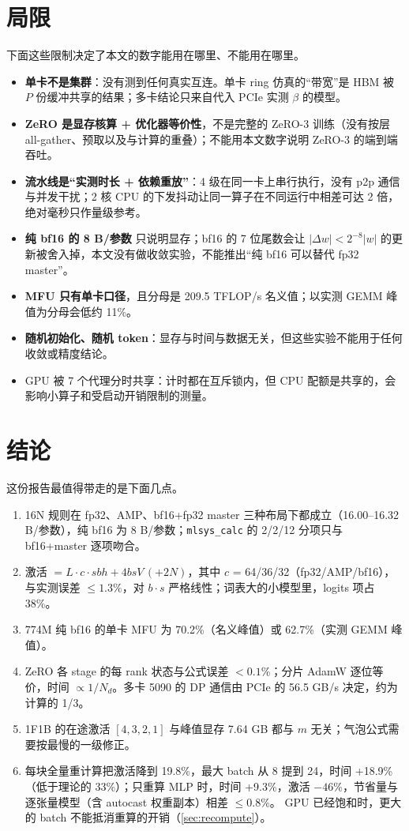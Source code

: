 \documentclass[11pt,a4paper]{ctexart}
\begin{document}
\section{局限}\label{sec:caveat}
下面这些限制决定了本文的数字能用在哪里、不能用在哪里。
\begin{caveatbox}
\begin{itemize}
\item \textbf{单卡不是集群}：没有测到任何真实互连。单卡 ring 仿真的“带宽”是 HBM 被 $P$ 份缓冲共享的结果；多卡结论只来自代入 PCIe 实测 $\beta$ 的模型。
\item \textbf{ZeRO 是显存核算 + 优化器等价性}，不是完整的 ZeRO-3 训练（没有按层 all-gather、预取以及与计算的重叠）；不能用本文数字说明 ZeRO-3 的端到端吞吐。
\item \textbf{流水线是“实测时长 + 依赖重放”}：4 级在同一卡上串行执行，没有 p2p 通信与并发干扰；2 核 CPU 的下发抖动让同一算子在不同运行中相差可达 2 倍，绝对毫秒只作量级参考。
\item \textbf{纯 bf16 的 8 B/参数} 只说明显存；bf16 的 7 位尾数会让 $|\Delta w| < 2^{-8}|w|$ 的更新被舍入掉，本文没有做收敛实验，不能推出“纯 bf16 可以替代 fp32 master”。
\item \textbf{MFU 只有单卡口径}，且分母是 209.5 TFLOP/s 名义值；以实测 GEMM 峰值为分母会低约 11\%。
\item \textbf{随机初始化、随机 token}：显存与时间与数据无关，但这些实验不能用于任何收敛或精度结论。
\item GPU 被 7 个代理分时共享：计时都在互斥锁内，但 CPU 配额是共享的，会影响小算子和受启动开销限制的测量。
\end{itemize}
\end{caveatbox}

\section{结论}
这份报告最值得带走的是下面几点。
\begin{enumerate}
\item 16N 规则在 fp32、AMP、bf16+fp32 master 三种布局下都成立（16.00--16.32 B/参数），纯 bf16 为 8 B/参数；\texttt{mlsys\_calc} 的 2/2/12 分项只与 bf16+master 逐项吻合。
\item 激活 $=L\cdot c\cdot sbh + 4bsV\,(+2N)$，其中 $c$ = 64/36/32（fp32/AMP/bf16），与实测误差 $\le1.3\%$，对 $b\cdot s$ 严格线性；词表大的小模型里，logits 项占 38\%。
\item 774M 纯 bf16 的单卡 MFU 为 70.2\%（名义峰值）或 62.7\%（实测 GEMM 峰值）。
\item ZeRO 各 stage 的每 rank 状态与公式误差 $<0.1\%$；分片 AdamW 逐位等价，时间 $\propto1/N_d$。多卡 5090 的 DP 通信由 PCIe 的 56.5 GB/s 决定，约为计算的 1/3。
\item 1F1B 的在途激活 $[4,3,2,1]$ 与峰值显存 7.64 GB 都与 $m$ 无关；气泡公式需要按最慢的一级修正。
\item 每块全量重计算把激活降到 19.8\%，最大 batch 从 8 提到 24，时间 +18.9\%（低于理论的 33\%）；只重算 MLP 时，时间 +9.3\%，激活 $-46\%$，节省量与逐张量模型（含 autocast 权重副本）相差 $\le0.8\%$。
GPU 已经饱和时，更大的 batch 不能抵消重算的开销（\cref{sec:recompute}）。
\end{enumerate}
\end{document}
